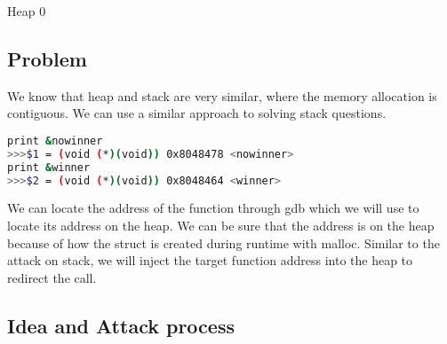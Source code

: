 
\begin{center}\begin{LARGE}Heap 0\end{LARGE}\end{center}
 
\subsection*{Problem}

We know that heap and stack are very similar, where the memory allocation
is contiguous. We can use a similar approach to solving stack questions.

\begin{lstlisting}[language=bash]
print &nowinner
>>>$1 = (void (*)(void)) 0x8048478 <nowinner>
print &winner
>>>$2 = (void (*)(void)) 0x8048464 <winner>
\end{lstlisting}

We can locate the address of the function  through gdb which
we will use to locate its address on the heap. We can be sure that the address
is on the heap because of how the struct  is created during runtime
with malloc. Similar to the attack on stack, we will inject the target function
address into the heap to redirect the call.

\subsection*{Idea and Attack process}

